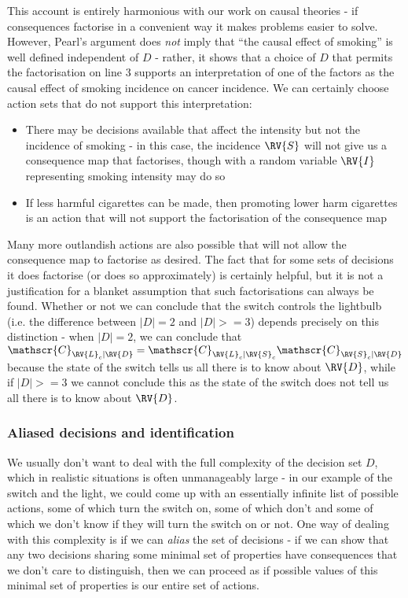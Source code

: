 This account is entirely harmonious with our work on causal theories - if consequences factorise in a convenient way it makes problems easier to solve. However, Pearl's argument does \emph{not} imply that ``the causal effect of smoking'' is well defined independent of $D$ - rather, it shows that a choice of $D$ that permits the factorisation on line 3 supports an interpretation of one of the factors as the causal effect of smoking incidence on cancer incidence. We can certainly choose action sets that do not support this interpretation:

\begin{itemize}
	\item There may be decisions available that affect the intensity but not the incidence of smoking - in this case, the incidence $\RV{S}$ will not give us a consequence map that factorises, though with a random variable $\RV{I}$ representing smoking intensity may do so 
	\item If less harmful cigarettes can be made, then promoting lower harm cigarettes is an action that will not support the factorisation of the consequence map
\end{itemize}

Many more outlandish actions are also possible that will not allow the consequence map to factorise as desired. The fact that for some sets of decisions it does factorise (or does so approximately) is certainly helpful, but it is not a justification for a blanket assumption that such factorisations can always be found. Whether or not we can conclude that the switch controls the lightbulb (i.e. the difference between $|D|=2$ and $|D|>=3$) depends precisely on this distinction - when $|D|=2$, we can conclude that $\mathscr{C}_{\RV{L}_c|\RV{D}} = \mathscr{C}_{\RV{L}_c|\RV{S}_c}\mathscr{C}_{\RV{S}_c|\RV{D}}$ because the state of the switch tells us all there is to know about $\RV{D}$, while if $|D|>=3$ we cannot conclude this as the state of the switch does not tell us all there is to know about $\RV{D}$.


\subsubsection{Aliased decisions and identification}

We usually don't want to deal with the full complexity of the decision set $D$, which in realistic situations is often unmanageably large - in our example of the switch and the light, we could come up with an essentially infinite list of possible actions, some of which turn the switch on, some of which don't and some of which we don't know if they will turn the switch on or not. One way of dealing with this complexity is if we can \emph{alias} the set of decisions - if we can show that any two decisions sharing some minimal set of properties have consequences that we don't care to distinguish, then we can proceed as if possible values of this minimal set of properties is our entire set of actions.

